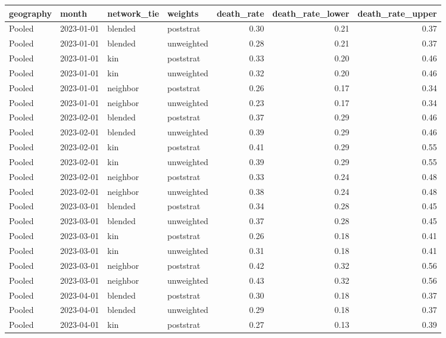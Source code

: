 \begin{table}[ht]
\centering
\begin{tabular}{llllrrr}
  \toprule
geography & month & network\_tie & weights & death\_rate & death\_rate\_lower & death\_rate\_upper \\ 
  \midrule
Pooled & 2023-01-01 & blended & poststrat & 0.30 & 0.21 & 0.37 \\ 
  Pooled & 2023-01-01 & blended & unweighted & 0.28 & 0.21 & 0.37 \\ 
  Pooled & 2023-01-01 & kin & poststrat & 0.33 & 0.20 & 0.46 \\ 
  Pooled & 2023-01-01 & kin & unweighted & 0.32 & 0.20 & 0.46 \\ 
  Pooled & 2023-01-01 & neighbor & poststrat & 0.26 & 0.17 & 0.34 \\ 
  Pooled & 2023-01-01 & neighbor & unweighted & 0.23 & 0.17 & 0.34 \\ 
  Pooled & 2023-02-01 & blended & poststrat & 0.37 & 0.29 & 0.46 \\ 
  Pooled & 2023-02-01 & blended & unweighted & 0.39 & 0.29 & 0.46 \\ 
  Pooled & 2023-02-01 & kin & poststrat & 0.41 & 0.29 & 0.55 \\ 
  Pooled & 2023-02-01 & kin & unweighted & 0.39 & 0.29 & 0.55 \\ 
  Pooled & 2023-02-01 & neighbor & poststrat & 0.33 & 0.24 & 0.48 \\ 
  Pooled & 2023-02-01 & neighbor & unweighted & 0.38 & 0.24 & 0.48 \\ 
  Pooled & 2023-03-01 & blended & poststrat & 0.34 & 0.28 & 0.45 \\ 
  Pooled & 2023-03-01 & blended & unweighted & 0.37 & 0.28 & 0.45 \\ 
  Pooled & 2023-03-01 & kin & poststrat & 0.26 & 0.18 & 0.41 \\ 
  Pooled & 2023-03-01 & kin & unweighted & 0.31 & 0.18 & 0.41 \\ 
  Pooled & 2023-03-01 & neighbor & poststrat & 0.42 & 0.32 & 0.56 \\ 
  Pooled & 2023-03-01 & neighbor & unweighted & 0.43 & 0.32 & 0.56 \\ 
  Pooled & 2023-04-01 & blended & poststrat & 0.30 & 0.18 & 0.37 \\ 
  Pooled & 2023-04-01 & blended & unweighted & 0.29 & 0.18 & 0.37 \\ 
  Pooled & 2023-04-01 & kin & poststrat & 0.27 & 0.13 & 0.39 \\ 

\end{tabular}
\end{table}
